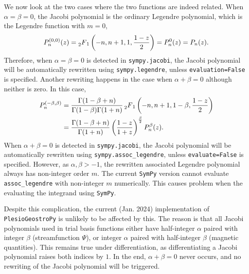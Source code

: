 We now look at the two cases where the two functions are indeed related. When $\alpha=\beta=0$, the Jacobi polynomial is the ordinary Legendre polynomial, which is the Legendre function with $m=0$,
\begin{equation}
    P_n^{(0,0)}(z) = \prescript{}{2}{F}_1 \left(-n, n+1, 1, \frac{1-z}{2}\right) = P_n^0(z) = P_n(z).
\end{equation}
Therefore, when $\alpha=\beta=0$ is detected in \colorbox{backcolour}{\lstinline|sympy.jacobi|}, the Jacobi polynomial will be automatically rewritten using \colorbox{backcolour}{\lstinline|sympy.legendre|}, unless \colorbox{backcolour}{\lstinline|evaluation=False|} is specified.
Another rewriting happens in the case when $\alpha + \beta=0$ although neither is zero. In this case,
\begin{equation}
\begin{aligned}
    P_n^{(-\beta,\beta)} &= \frac{\Gamma(1 - \beta + n)}{\Gamma(1 - \beta) \Gamma(1 + n)} \prescript{}{2}{F}_1 \left(-n, n+1,1-\beta,\frac{1-z}{2}\right) \\ 
    &= \frac{\Gamma(1 - \beta + n)}{\Gamma(1 + n)} \left(\frac{1 - z}{1 + z}\right)^{\frac{\beta}{2}} P_n^\beta(z).
\end{aligned}
\end{equation}
When $\alpha + \beta = 0$ is detected in \colorbox{backcolour}{\lstinline|sympy.jacobi|}, the Jacobi polynomial will be automatically rewritten using \colorbox{backcolour}{\lstinline|sympy.assoc_legendre|}, unless \colorbox{backcolour}{\lstinline|evaluate=False|} is specified.
However, as $\alpha,\beta > -1$, the rewritten associated Legendre polynomial always has non-integer order $m$. The current \texttt{SymPy} version cannot evaluate \colorbox{backcolour}{\lstinline|assoc_legendre|} with non-integer $m$ numerically. This causes problem when the evaluating the integrand using \texttt{SymPy}.

Despite this complication, the current (Jan. 2024) implementation of \texttt{PlesioGeostroPy} is unlikely to be affected by this. The reason is that all Jacobi polynomials used in trial basis functions either have half-integer $\alpha$ paired with integer $\beta$ (streamfunction $\Psi$), or integer $\alpha$ paired with half-integer $\beta$ (magnetic quantities).
This remains true under differentiation, as differentiating a Jacobi polynomial raises both indices by $1$. In the end, $\alpha + \beta = 0$ never occurs, and no rewriting of the Jacobi polynomial will be triggered.

